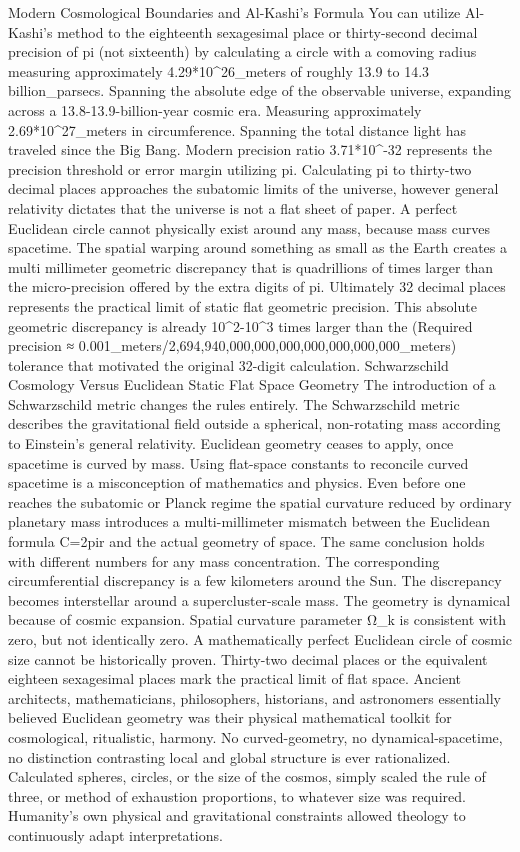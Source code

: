 {Modern Cosmological Boundaries and Al-Kashi’s Formula
You can utilize Al-Kashi’s method to the eighteenth sexagesimal place or thirty-second decimal precision of pi (not sixteenth) by calculating a circle with a comoving radius measuring approximately 4.29*10^26_meters of roughly 13.9 to 14.3 billion_parsecs. Spanning the absolute edge of the observable universe, expanding across a 13.8-13.9-billion-year cosmic era. Measuring approximately 2.69*10^27_meters in circumference. Spanning the total distance light has traveled since the Big Bang. Modern precision ratio  3.71*10^-32 represents the precision threshold or error margin utilizing pi. Calculating pi to thirty-two decimal places approaches the subatomic limits of the universe, however general relativity dictates that the universe is not a flat sheet of paper. 
A perfect Euclidean circle cannot physically exist around any mass, because mass curves spacetime. The spatial warping around something as small as the Earth creates a multi millimeter geometric discrepancy that is quadrillions of times larger than the micro-precision offered by the extra digits of pi. Ultimately 32 decimal places represents the practical limit of static flat geometric precision. This absolute geometric discrepancy is already 10^2-10^3 times larger than the (Required precision ≈ 0.001_meters/2,694,940,000,000,000,000,000,000,000_meters) tolerance that motivated the original 32-digit calculation. 
Schwarzschild Cosmology Versus Euclidean Static Flat Space Geometry
The introduction of a Schwarzschild metric changes the rules entirely. The Schwarzschild metric describes the gravitational field outside a spherical, non-rotating mass according to Einstein’s general relativity. Euclidean geometry ceases to apply, once spacetime is curved by mass. Using flat-space constants to reconcile curved spacetime is a misconception of mathematics and physics. Even before one reaches the subatomic or Planck regime the spatial curvature reduced by ordinary planetary mass introduces a multi-millimeter mismatch between the Euclidean formula C=2pir and the actual geometry of space. The same conclusion holds with different numbers for any mass concentration. 
The corresponding circumferential discrepancy is a few kilometers around the Sun. The discrepancy becomes interstellar around a supercluster-scale mass. The geometry is dynamical because of cosmic expansion. Spatial curvature parameter Ω_k is consistent with zero, but not identically zero. A mathematically perfect Euclidean circle of cosmic size cannot be historically proven. Thirty-two decimal places or the equivalent eighteen sexagesimal places mark the practical limit of flat space. Ancient architects, mathematicians, philosophers, historians, and astronomers essentially believed Euclidean geometry was their physical mathematical toolkit for cosmological, ritualistic, harmony. No curved-geometry, no dynamical-spacetime, no distinction contrasting local and global structure is ever rationalized. Calculated spheres, circles, or the size of the cosmos, simply scaled the rule of three, or method of exhaustion proportions, to whatever size was required. Humanity’s own physical and gravitational constraints allowed theology to continuously adapt interpretations. 
}

